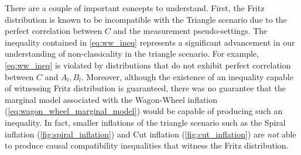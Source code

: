 \documentclass[aps, 10pt, english, twoside, pra, nofootinbib, tightenlines, longbibliography]{revtex4-1}
\begin{document}
    There are a couple of important concepts to understand. First, the Fritz distribution is known to be incompatible with the Triangle scenario due to the perfect correlation between $C$ and the measurement pseudo-settings. The inequality contained in \cref{eq:ww_ineq} represents a significant advancement in our understanding of non-classicality in the triangle scenario. For example, \cref{eq:ww_ineq} is violated by distributions that do not exhibit perfect correlation between $C$ and $A_l, B_l$. Moreover, although the existence of an inequality capable of witnessing Fritz distribution is guaranteed, there was no guarantee that the marginal model associated with the Wagon-Wheel inflation (\cref{eq:wagon_wheel_marginal_model}) would be capable of producing such an inequality. In fact, smaller inflations of the triangle scenario such as the Spiral inflation (\cref{fig:spiral_inflation}) and Cut inflation (\cref{fig:cut_inflation}) are \textit{not} able to produce causal compatibility inequalities that witness the Fritz distribution.
\end{document}
